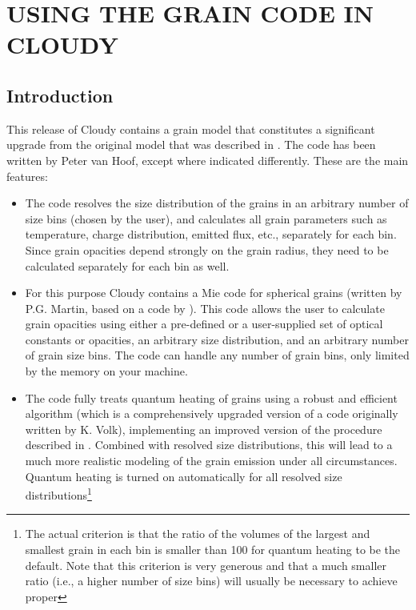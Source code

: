 \chapter{USING THE GRAIN CODE IN CLOUDY}
\label{grain:appendix}

\section{Introduction}

This release of Cloudy contains a grain model that constitutes a
significant upgrade from the original model that was described in
\citet{Baldwin1991}. The code has been written by Peter van Hoof, except
where indicated differently. These are the main features:
\begin{itemize}
\item The code resolves the size distribution of the grains in an arbitrary
  number of size bins (chosen by the user), and calculates all grain
  parameters such as temperature, charge distribution, emitted flux, etc.,
  separately for each bin. Since grain opacities depend strongly on the grain
  radius, they need to be calculated separately for each bin as well.
\item For this purpose Cloudy contains a Mie code for spherical grains
  (written by P.G. Martin, based on a code by \citet{Hansen1974}). This code
  allows the user to calculate grain opacities using either a pre-defined or a
  user-supplied set of optical constants or opacities, an arbitrary size
  distribution, and an arbitrary number of grain size bins. The code can
  handle any number of grain bins, only limited by the memory on your machine.
\item The code fully treats quantum heating of grains using a robust and
  efficient algorithm (which is a comprehensively upgraded version of a code
  originally written by K. Volk), implementing an improved version of the
  procedure described in \citet{Guhathakurta1989}. Combined with resolved size
  distributions, this will lead to a much more realistic modeling of the grain
  emission under all circumstances. Quantum heating is turned on automatically
  for all resolved size distributions\footnote{The actual criterion is that
    the ratio of the volumes of the largest and smallest grain in each bin is
    smaller than 100 for quantum heating to be the default. Note that this
    criterion is very generous and that a much smaller ratio (i.e., a higher
    number of size bins) will usually be necessary to achieve proper
}
\end{itemize}
